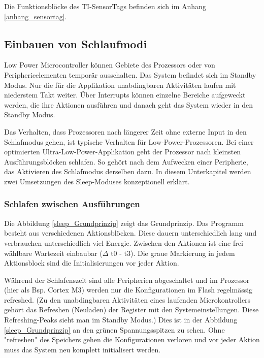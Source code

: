Die Funktionsblöcke des TI-SensorTags befinden sich im Anhang \ref{anhang_sensortag}.

\subsection{Einbauen von Schlaufmodi}\label{pm_sleep} 

Low Power Microcontroller können Gebiete des Prozessors oder von Peripherieelementen temporär ausschalten. Das System befindet sich im Standby Modus. Nur die für die Applikation unabdingbaren Aktivitäten laufen mit niederstem Takt weiter. Über Interrupts können einzelne Bereiche aufgeweckt werden, die ihre Aktionen ausführen und danach geht das System wieder in den Standby Modus.


Das Verhalten, dass Prozessoren nach längerer Zeit ohne externe Input in den Schlafmodus gehen, ist typische Verhalten für Low-Power-Prozessoren. Bei einer optimierten Ultra-Low-Power-Applikation geht der Prozessor nach kleinsten Ausführungsblöcken schlafen. So gehört nach dem Aufwecken einer Peripherie, das Aktivieren des Schlafmodus derselben dazu. In diesem Unterkapitel werden zwei Umsetzungen des Sleep-Moduses konzeptionell erklärt.

\subsubsection{Schlafen zwischen Ausführungen}
\label{schlafen_theorie}

Die Abbildung \ref{sleep_Grundprinzip} zeigt das Grundprinzip. Das Programm besteht aus verschiedenen Aktionsblöcken. Diese dauern unterschiedlich lang und verbrauchen unterschiedlich viel Energie. Zwischen den Aktionen ist eine frei wählbare Wartezeit einbaubar ($\Delta$ t0 - t3). Die graue Markierung in jedem Aktionsblock sind die Initialisierungen vor jeder Aktion.

Während der Schlafenszeit sind alle Peripherien abgeschaltet und im Prozessor (hier als Bsp. Cortex M3) werden nur die Konfigurationen im Flash regelmässig \glqq refreshed\grqq. (Zu den unabdingbaren Aktivitäten eines laufenden Microkontrollers gehört das Refreshen (Neuladen) der Register mit den Systemeinstellungen. Diese Refreshing-Peaks sieht man im Standby Modus.)  Dies ist in der Abbildung \ref{sleep_Grundprinzip} an den grünen Spannungsspitzen zu sehen. Ohne "refreshen" des Speichers gehen die Konfigurationen verloren und vor jeder Aktion muss das System neu komplett initialisert werden.

